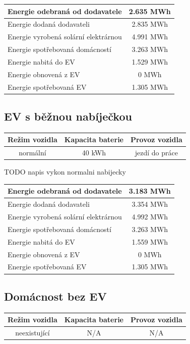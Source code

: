 \documentclass[12pt,a4paper]{article}
\begin{document}
\bigskip
\begin{tabular}{ | l | c | }
\hline
Energie odebraná od dodavatele & 2.635 MWh \\
\hline
Energie dodaná dodavateli & 2.835 MWh \\
\hline
Energie vyrobená solární elektrárnou & 4.991 MWh \\
\hline
Energie spotřebovaná domácností & 3.263 MWh \\
\hline
Energie nabitá do EV & 1.529 MWh \\
\hline
Energie obnovená z EV & 0 MWh \\
\hline
Energie spotřebovaná EV & 1.305 MWh \\
\hline
\end{tabular}
\bigskip


\subsection{EV s běžnou nabíječkou}

\bigskip
\begin{tabular}{ | c | c | c | }
\hline
Režim vozidla & Kapacita baterie & Provoz vozidla \\
\hline
normální & 40 kWh & jezdí do práce \\
\hline
\end{tabular}
\bigskip

TODO napis vykon normalni nabijecky

\bigskip
\begin{tabular}{ | l | c | }
\hline
Energie odebraná od dodavatele & 3.183 MWh \\
\hline
Energie dodaná dodavateli & 3.354 MWh \\
\hline
Energie vyrobená solární elektrárnou & 4.992 MWh \\
\hline
Energie spotřebovaná domácností & 3.263 MWh \\
\hline
Energie nabitá do EV & 1.559 MWh \\
\hline
Energie obnovená z EV & 0 MWh \\
\hline
Energie spotřebovaná EV & 1.305 MWh \\
\hline
\end{tabular}
\bigskip


\subsection{Domácnost bez EV}

\bigskip
\begin{tabular}{ | c | c | c | }
\hline
Režim vozidla & Kapacita baterie & Provoz vozidla \\
\hline
neexistující & N/A & N/A \\
\hline
\end{tabular}
\bigskip
\end{document}
